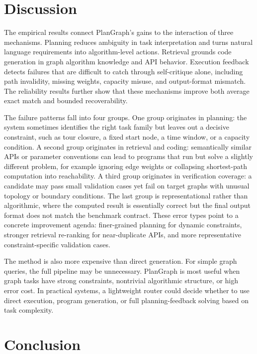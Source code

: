 \documentclass[pdflatex,sn-mathphys-num]{sn-jnl}
\theoremstyle{thmstyleone}
\theoremstyle{thmstyletwo}
\theoremstyle{thmstylethree}
\begin{document}
\section{Discussion}\label{sec:discussion}

The empirical results connect PlanGraph's gains to the interaction of three mechanisms. Planning reduces ambiguity in task interpretation and turns natural language requirements into algorithm-level actions. Retrieval grounds code generation in graph algorithm knowledge and API behavior. Execution feedback detects failures that are difficult to catch through self-critique alone, including path invalidity, missing weights, capacity misuse, and output-format mismatch. The reliability results further show that these mechanisms improve both average exact match and bounded recoverability.

The failure patterns fall into four groups. One group originates in planning: the system sometimes identifies the right task family but leaves out a decisive constraint, such as tour closure, a fixed start node, a time window, or a capacity condition. A second group originates in retrieval and coding: semantically similar APIs or parameter conventions can lead to programs that run but solve a slightly different problem, for example ignoring edge weights or collapsing shortest-path computation into reachability. A third group originates in verification coverage: a candidate may pass small validation cases yet fail on target graphs with unusual topology or boundary conditions. The last group is representational rather than algorithmic, where the computed result is essentially correct but the final output format does not match the benchmark contract. These error types point to a concrete improvement agenda: finer-grained planning for dynamic constraints, stronger retrieval re-ranking for near-duplicate APIs, and more representative constraint-specific validation cases.

The method is also more expensive than direct generation. For simple graph queries, the full pipeline may be unnecessary. PlanGraph is most useful when graph tasks have strong constraints, nontrivial algorithmic structure, or high error cost. In practical systems, a lightweight router could decide whether to use direct execution, program generation, or full planning-feedback solving based on task complexity.

\section{Conclusion}\label{sec:conclusion}
\end{document}
